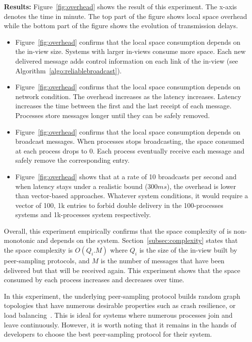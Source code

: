 \noindent \textbf{Results:} Figure~\ref{fig:overhead} shows the result of this
experiment. The x-axis denotes the time in minute. The top part of the figure
shows local space overhead while the bottom part of the figure shows the
evolution of transmission delays. 

\begin{itemize}
\item Figure~\ref{fig:overhead} confirms that the local space consumption
  depends on the in-view size. Systems with larger in-views consume more
  space. Each new delivered message adds control information on each link of the
  in-view (see Algorithm~\ref{algo:reliablebroadcast}).
\item Figure~\ref{fig:overhead} confirms that the local space consumption
  depends on network condition. The overhead increases as the latency
  increases. Latency increases the time between the first and the last receipt
  of each message. Processes store messages longer until they can be safely
  removed. 
\item Figure~\ref{fig:overhead} confirms that the local space consumption
  depends on broadcast messages. When processes stops broadcasting, the space
  consumed at each process drops to 0. Each process eventually receive each
  message and safely remove the corresponding entry.
\item Figure~\ref{fig:overhead} shows that at a rate of 10 broadcasts per second
  and when latency stays under a realistic bound ($300ms$), the overhead is
  lower than vector-based approaches. Whatever system conditions, it would
  require a vector of 100, 1k entries to forbid double delivery in the
  100-processes systems and 1k-processes system respectively. 
\end{itemize}

\noindent Overall, this experiment empirically confirms that the space
complexity of \RPCBROADCAST is non-monotonic and depends on the
system. Section~\ref{subsec:complexity} states that the space complexity is
$O(Q_i.M)$ where $Q_i$ is the size of the in-view built by peer-sampling
protocols, and $M$ is the number of messages that have been delivered but that
will be received again. This experiment shows that the space consumed by each
process increases and decreases over time.

\noindent In this experiment, the underlying peer-sampling protocol builds
random graph topologies that have numerous desirable properties such as crash
resilience, or load balancing~\cite{jelasity2007gossip}. This is ideal for
systems where numerous processes join and leave continuously. However, it is
worth noting that it remains in the hands of developers to choose the best
peer-sampling protocol for their system.


